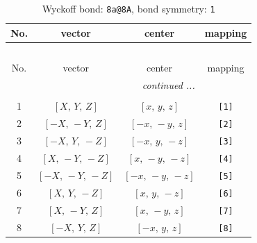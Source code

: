\documentclass[fleqn,8pt]{jsarticle}
\begin{document}
\begin{longtable}{cccc}
\caption{Wyckoff bond: {\tt 8a@8A}, bond symmetry: {\tt 1}}
 \\
 \hline \hline
No. & vector & center & mapping \\ \hline \endfirsthead

\multicolumn{3}{l}{\tablename\ \thetable{}} \\
 \hline \hline
No. & vector & center & mapping \\ \hline \endhead

 \hline \hline
\multicolumn{3}{r}{\footnotesize\it continued ...} \\ \endfoot

 \hline \hline
\multicolumn{3}{r}{} \\ \endlastfoot

1 & $\left[ X,\, Y,\, Z \right]$ & $\left[ x,\, y,\, z \right]$ & {\tt [1]} \\ \hline
2 & $\left[ - X,\, - Y,\, Z \right]$ & $\left[ - x,\, - y,\, z \right]$ & {\tt [2]} \\ \hline
3 & $\left[ - X,\, Y,\, - Z \right]$ & $\left[ - x,\, y,\, - z \right]$ & {\tt [3]} \\ \hline
4 & $\left[ X,\, - Y,\, - Z \right]$ & $\left[ x,\, - y,\, - z \right]$ & {\tt [4]} \\ \hline
5 & $\left[ - X,\, - Y,\, - Z \right]$ & $\left[ - x,\, - y,\, - z \right]$ & {\tt [5]} \\ \hline
6 & $\left[ X,\, Y,\, - Z \right]$ & $\left[ x,\, y,\, - z \right]$ & {\tt [6]} \\ \hline
7 & $\left[ X,\, - Y,\, Z \right]$ & $\left[ x,\, - y,\, z \right]$ & {\tt [7]} \\ \hline
8 & $\left[ - X,\, Y,\, Z \right]$ & $\left[ - x,\, y,\, z \right]$ & {\tt [8]} \\
\end{longtable}
\end{document}
